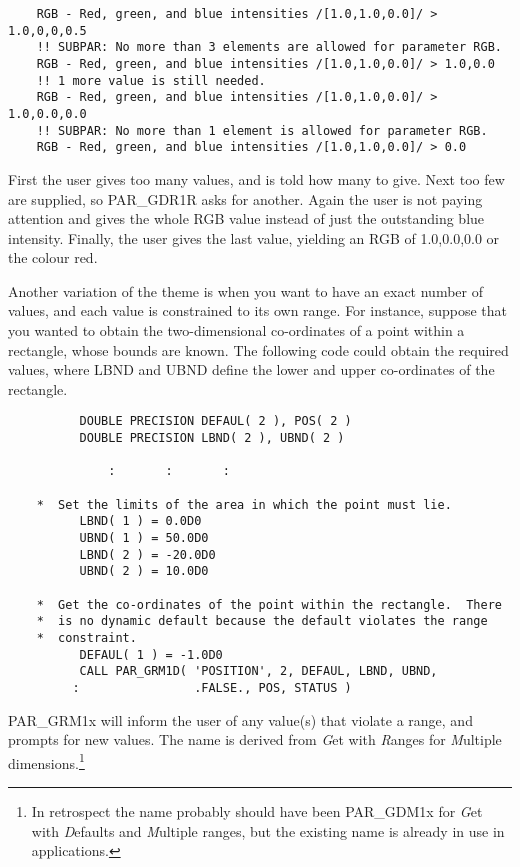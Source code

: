 \documentclass[twoside,11pt]{article}
\begin{document}
\begin{verbatim}
    RGB - Red, green, and blue intensities /[1.0,1.0,0.0]/ > 1.0,0,0,0.5
    !! SUBPAR: No more than 3 elements are allowed for parameter RGB.
    RGB - Red, green, and blue intensities /[1.0,1.0,0.0]/ > 1.0,0.0
    !! 1 more value is still needed.
    RGB - Red, green, and blue intensities /[1.0,1.0,0.0]/ > 1.0,0.0,0.0
    !! SUBPAR: No more than 1 element is allowed for parameter RGB.
    RGB - Red, green, and blue intensities /[1.0,1.0,0.0]/ > 0.0
\end{verbatim} 

First the user gives too many values, and is told how many to give.
Next too few are supplied, so PAR\_GDR1R asks for another.  Again
the user is not paying attention and gives the whole RGB value instead
of just the outstanding blue intensity.  Finally, the user gives the
last value, yielding an RGB of 1.0,0.0,0.0 or the colour red.

Another variation of the theme is when you want to have an exact number
of values, and each value is constrained to its own range.  
For instance, suppose that you wanted to obtain the
two-dimensional co-ordinates of a point within a rectangle, whose bounds
are known.  The following code could obtain the required values, where
LBND and UBND define the lower and upper co-ordinates of the rectangle.

\begin{verbatim}
          DOUBLE PRECISION DEFAUL( 2 ), POS( 2 )
          DOUBLE PRECISION LBND( 2 ), UBND( 2 )

              :       :       :

    *  Set the limits of the area in which the point must lie.
          LBND( 1 ) = 0.0D0
          UBND( 1 ) = 50.0D0
          LBND( 2 ) = -20.0D0
          UBND( 2 ) = 10.0D0

    *  Get the co-ordinates of the point within the rectangle.  There
    *  is no dynamic default because the default violates the range
    *  constraint.
          DEFAUL( 1 ) = -1.0D0
          CALL PAR_GRM1D( 'POSITION', 2, DEFAUL, LBND, UBND, 
         :                .FALSE., POS, STATUS )
\end{verbatim}

PAR\_GRM1x will inform the user of any value(s) that violate a range,
and prompts for new values.  The name is derived from {\em G\/}et with
{\em R\/}anges for {\em M\/}ultiple dimensions.\footnote{In retrospect
the name probably should have been PAR\_GDM1x for {\em G\/}et with
{\em D\/}efaults and {\em M\/}ultiple ranges, but the existing name is
already in use in applications.} 
\end{document}
